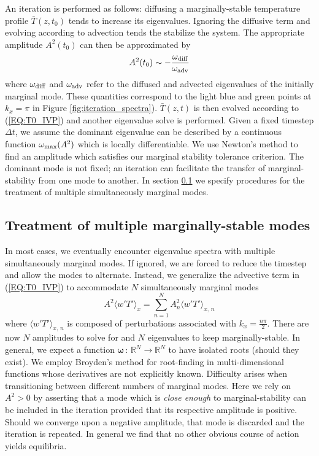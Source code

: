 \documentclass[reprint,amsmath,amssymb,aps]{revtex4-1}
\begin{document}
An iteration is performed as follows: diffusing a marginally-stable temperature profile $\bar{T}(z, t_0)$ tends to increase its eigenvalues. 
Ignoring the diffusive term and evolving according to advection tends the stabilize the system. The appropriate amplitude $A^2(t_0)$ can then be approximated by
\begin{equation}
    A^2(t_0) \sim -\frac{\omega_{\rm{diff}}}{\omega_{\rm{adv}}}
\end{equation}
where $\omega_{\rm{diff}}$ and $\omega_{\rm{adv}}$ refer to the diffused and advected eigenvalues of the initially marginal mode. These quantities correspond to the light blue and green points at $k_x = \pi$ in Figure \ref{fig:iteration_spectra}). 
$\bar{T}(z, t)$ is then evolved according to (\ref{EQ:T0_IVP}) and another eigenvalue solve is performed. 
Given a fixed timestep $\Delta t$, we assume the dominant eigenvalue can be described by a continuous function $\omega_{\rm{max}} (A^2)$ which is locally differentiable. 
We use Newton's method to find an amplitude which satisfies our marginal stability tolerance criterion. 
The dominant mode is not fixed; an iteration can facilitate the transfer of marginal-stability from one mode to another. 
In section \ref{sec:multiple_modes} we specify procedures for the treatment of multiple simultaneously marginal modes.

\subsection{Treatment of multiple marginally-stable modes} \label{sec:multiple_modes}
In most cases, we eventually encounter eigenvalue spectra with multiple simultaneously marginal modes. If ignored, we are forced to reduce the timestep and allow the modes to alternate. Instead, we generalize the advective term in (\ref{EQ:T0_IVP}) to accommodate $N$ simultaneously marginal modes
\begin{equation}
    A^2 \langle w' T' \rangle_x = \sum_{n = 1}^{N} A^2_{n} \langle w' T' \rangle_{x, \, n}
\end{equation}
where  $\langle w' T' \rangle_{x, \, n}$ is composed of perturbations associated with $k_x = \frac{n\pi}{2}$. 
There are now $N$ amplitudes to solve for and $N$ eigenvalues to keep marginally-stable. 
In general, we expect a function $\mathbf{\omega} \, : \, \mathbb{R}^N \to  \mathbb{R}^N$ to have isolated roots (should they exist). 
We employ Broyden's method for root-finding in multi-dimensional functions whose derivatives are not explicitly known. 
Difficulty arises when transitioning between different numbers of marginal modes. 
Here we rely on $A^2 > 0$ by asserting that a mode which is \textit{close enough} to marginal-stability can be included in the iteration provided that its respective amplitude is positive. 
Should we converge upon a negative amplitude, that mode is discarded and the iteration is repeated. 
In general we find that no other obvious course of action yields equilibria.
\end{document}
